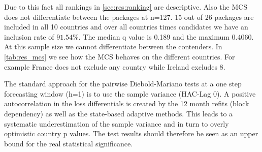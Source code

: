 Due to this fact all rankings in \cref{sec:res:ranking} are descriptive.
%
Also the MCS does not differentiate between the packages at n=127. 15 out of 26 packages are included in all 10 countries and over all countries times candidates we have an inclusion rate of $91.54\%$. The median q value is 0.189 and the maximum 0.4060. At this sample size we cannot differentiate between the contenders. In \cref{tab:res_mcs} we see how the MCS behaves on the different countries. For example France does not exclude any country while Ireland excludes 8.

The standard approach for the pairwise Diebold-Mariano tests \parencite{dieboldmariano1995} at a one step forecasting window (h=1) is to use the sample variance (HAC-Lag 0). A positive autocorrelation in the loss differentials is created by the 12 month refits (block dependency) as well as the state-based adaptive methods. This leads to a systematic underestimation of the sample variance and in turn to overly optimistic country p values. The test results should therefore be seen as an upper bound for the real statistical significance.


